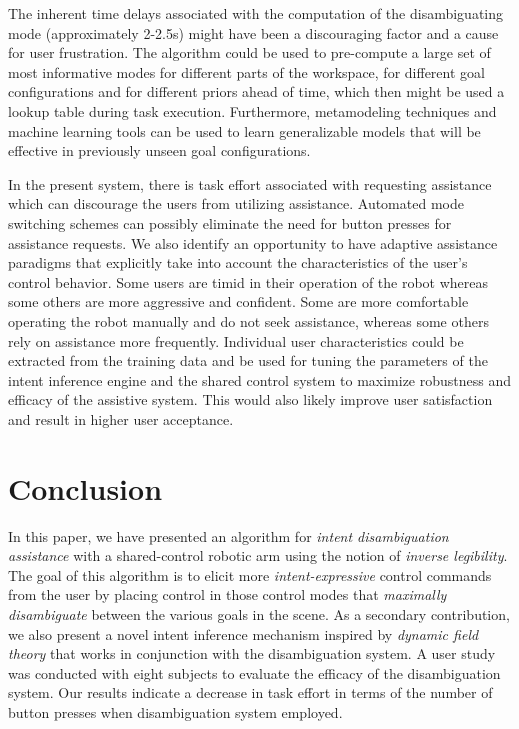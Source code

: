  The inherent time delays associated with the computation of the disambiguating mode (approximately 2-2.5s) might have been a discouraging factor and a cause for user frustration. The algorithm could be used to pre-compute a large set of most informative modes for different parts of the workspace, for different goal configurations and for different priors ahead of time, which then might be used a lookup table during task execution. Furthermore, metamodeling techniques and machine learning tools can be used to learn generalizable models that will be effective in previously unseen goal configurations. 
 
 In the present system, there is task effort associated with requesting assistance which can discourage the users from utilizing assistance. Automated mode switching schemes can possibly eliminate the need for button presses for assistance requests. 
 We also identify an opportunity to have adaptive assistance paradigms that explicitly take into account the characteristics of the user's control behavior. Some users are timid in their operation of the robot whereas some others are more aggressive and confident. Some are more comfortable operating the robot manually and do not seek assistance, whereas some others rely on assistance more frequently. Individual user characteristics could be extracted from the training data and be used for tuning the parameters of the intent inference engine and the shared control system to maximize robustness and efficacy of the assistive system. This would also likely improve user satisfaction and result in higher user acceptance. 
 
 
 
\section{Conclusion}\label{sec:conclusions}
In this paper, we have presented an algorithm for \textit{intent disambiguation assistance} with a shared-control robotic arm using the notion of \textit{inverse legibility}. The goal of this algorithm is to elicit more \textit{intent-expressive} control commands from the user by placing control in those control modes that \textit{maximally disambiguate} between the various goals in the scene. As a secondary contribution, we also present a novel intent inference mechanism inspired by \textit{dynamic field theory} that works in conjunction with the disambiguation system. A user study was conducted with eight subjects to evaluate the efficacy of the disambiguation system. Our results indicate a decrease in task effort in terms of the number of button presses when disambiguation system employed. 


